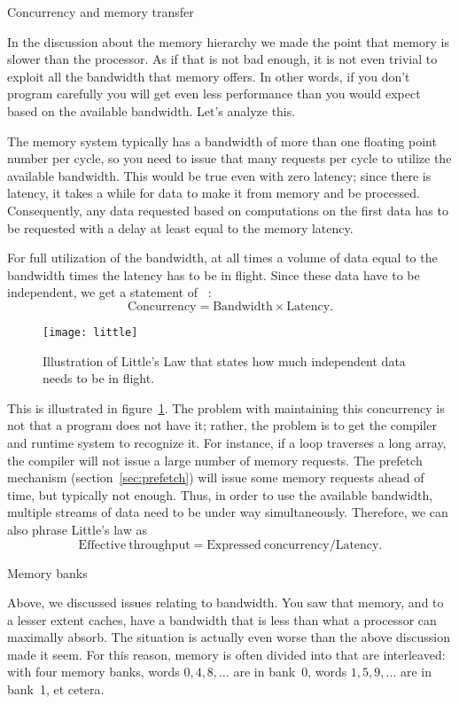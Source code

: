 
 {Concurrency and memory transfer}

In the discussion about the memory hierarchy we made the point that
memory is slower than the processor. As if that is not bad enough, it
is not even trivial to exploit all the bandwidth that memory
offers. In other words, if you don't program carefully you will get
even less performance than you would expect based on the available
bandwidth. Let's analyze this.

The memory system typically has a bandwidth of more than one floating
point number per cycle, so you need to issue that many requests per
cycle to utilize the available bandwidth. This would be true even with
zero latency; since there is latency, it takes a while for data to
make it from memory and be processed. Consequently, any data requested
based on computations on the first data has to be requested with a
delay at least equal to the memory latency.

For full utilization of the bandwidth,
at all times a volume of data equal to the bandwidth times
the latency has to be in flight. Since these data have to be
independent, we get a statement of ~\cite{Little:law}:
\[ \mathrm{Concurrency}=\mathrm{Bandwidth}\times \mathrm{Latency}. \]
\begin{figure}[ht]
  \texttt{[image: little]}
  \caption{Illustration of Little's Law that states how much
    independent data needs to be in flight.}
  \label{fig:little}
\end{figure}
This is illustrated in figure~\ref{fig:little}. The problem with
maintaining this concurrency is not that a program does not have it;
rather, the problem is to get the compiler and runtime system
to recognize it.
For instance, if a loop traverses a long array, the
compiler will not issue a large number of memory requests. The
prefetch mechanism (section~\ref{sec:prefetch}) will issue some memory
requests ahead of time, but typically not enough. Thus, in order to
use the available bandwidth, multiple streams of data need to be under
way simultaneously. Therefore, we can also phrase Little's law as
\[ \mathrm{Effective\ throughput}=\mathrm{Expressed\ concurrency} / \mathrm{Latency}. \]

 {Memory banks}
\label{sec:banks}

Above, we discussed issues relating to bandwidth. You saw that memory,
and to a lesser extent caches, have a bandwidth that is less than what
a processor can maximally absorb. The situation is actually even worse
than the above discussion made it seem. For this reason, memory is
often divided into  that are interleaved: with
four memory banks, words $0,4,8,\ldots$ are in bank~0, words
$1,5,9,\ldots$ are in bank~1, et cetera. 

